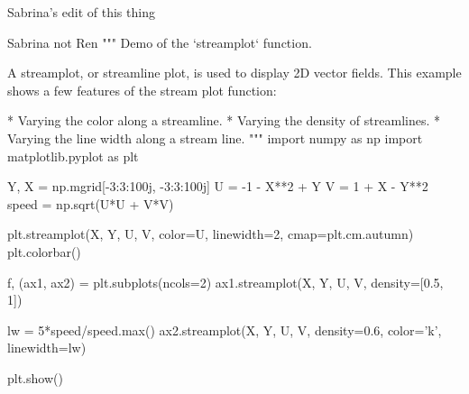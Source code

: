 Sabrina's edit of this thing

Sabrina not Ren
"""
Demo of the `streamplot` function.

A streamplot, or streamline plot, is used to display 2D vector fields. This
example shows a few features of the stream plot function:

    * Varying the color along a streamline.
    * Varying the density of streamlines.
    * Varying the line width along a stream line.
"""
import numpy as np
import matplotlib.pyplot as plt

Y, X = np.mgrid[-3:3:100j, -3:3:100j]
U = -1 - X**2 + Y
V = 1 + X - Y**2
speed = np.sqrt(U*U + V*V)

plt.streamplot(X, Y, U, V, color=U, linewidth=2, cmap=plt.cm.autumn)
plt.colorbar()

f, (ax1, ax2) = plt.subplots(ncols=2)
ax1.streamplot(X, Y, U, V, density=[0.5, 1])

lw = 5*speed/speed.max()
ax2.streamplot(X, Y, U, V, density=0.6, color='k', linewidth=lw)

plt.show()

